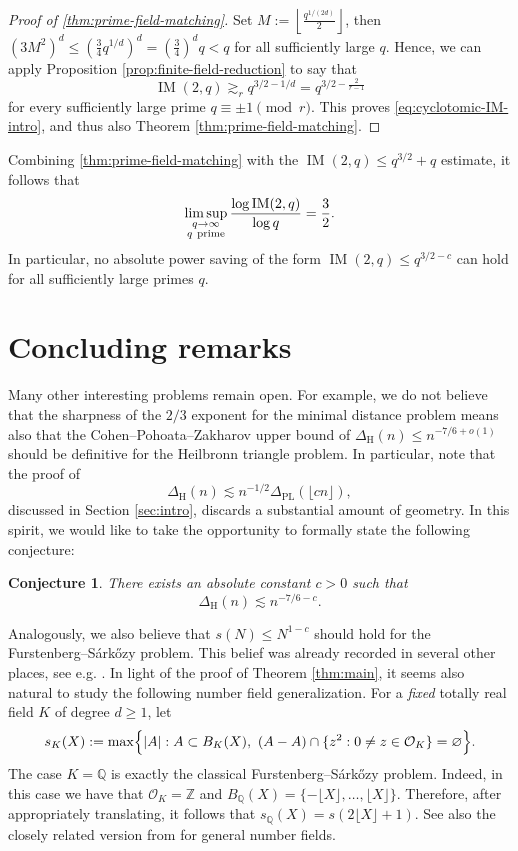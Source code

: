 \documentclass[11pt,reqno]{amsart}
\newtheorem{conjecture}[conjecture]{Conjecture}
\theoremstyle{definition}
\theoremstyle{remark}
\newcommand{\OK}{\mathcal{O}_K}
\newcommand{\PL}{\Delta_{\mathrm{PL}}}
\begin{document}
\begin{proof}[Proof of \cref{thm:prime-field-matching}] 

Set $M:=\left\lfloor\frac{q^{1/(2d)}}2\right\rfloor$, then $(3M^2)^d \le\left(\frac34q^{1/d}\right)^d =\left(\frac34\right)^dq <q$ for all sufficiently large $q$. Hence, we can apply Proposition \ref{prop:finite-field-reduction} to say that
\[
        \operatorname{IM}(2,q) \gtrsim_r  q^{3/2-1/d}  =
        q^{3/2-\frac{2}{r-1}}
\]
for every sufficiently large prime $q\equiv\pm1\pmod r$. This proves
\eqref{eq:cyclotomic-IM-intro}, and thus also Theorem \ref{thm:prime-field-matching}.
\end{proof}

Combining \cref{thm:prime-field-matching} with
the $\operatorname{IM}(2,q) \leq q^{3/2}+q$ estimate, it follows that
\[
        \limsup_{\substack{q\to\infty\\q\ {\rm prime}}}
        \frac{\log\operatorname{IM}(2,q)}{\log q}
        =
        \frac32.
\]
In particular, no absolute power saving of the form
$\operatorname{IM}(2,q)\le q^{3/2-c}$ can hold for all sufficiently large primes $q$.

\section{Concluding remarks}
\label{sec:perspective}

Many other interesting problems remain open. For example, we do not believe that the sharpness of the $2/3$ exponent for the minimal distance problem means also that the Cohen--Pohoata--Zakharov upper bound of $\Delta_{\mathrm H}(n)\le n^{-7/6+o(1)}$ should be definitive for the Heilbronn triangle problem. In particular, note that the proof of
\[
        \Delta_{\mathrm H}(n)
        \lesssim n^{-1/2}\PL(\lfloor cn\rfloor),
\]
discussed in Section \ref{sec:intro}, discards a substantial amount of geometry. In this spirit, we would like to take the opportunity to formally state the following conjecture: 

\begin{conjecture}
There exists an absolute constant $c>0$ such that
$$\Delta_{\mathrm H}(n)\lesssim n^{-7/6-c}.$$
\end{conjecture}

Analogously, we also believe that $s(N) \leq N^{1-c}$ should hold for the Furstenberg--S\'ark\H{o}zy problem. This belief was already recorded in several other places, see e.g. \cite{GreenSawhney2024}. In light of the proof of Theorem \ref{thm:main}, it seems also natural to study the following number field generalization. For a {\it{fixed}} totally real field $K$ of degree $d \geq 1$, let
\[
        s_K(X)
        :=\max\Bigl\{|A|:A\subset B_K(X),\ 
        (A-A)\cap\{z^2:0\ne z\in\OK\}=\varnothing\Bigr\}.
\]
The case $K=\mathbb Q$ is exactly the classical Furstenberg--S\'ark\H{o}zy problem. Indeed, in this case we have that $\OK=\mathbb Z$ and $B_{\mathbb Q}(X) = \{-\lfloor X\rfloor,\ldots,\lfloor X\rfloor\}$. Therefore, after appropriately translating, it follows that $s_{\mathbb Q}(X)=s(2\lfloor X\rfloor+1)$. See also the closely related version from \cite{PandeySaha2025} for general number fields. 
\end{document}
